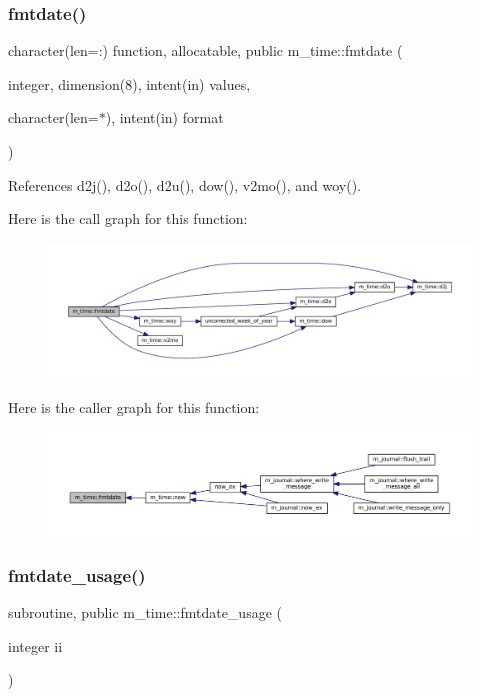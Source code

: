 \subsubsection{\texorpdfstring{fmtdate()}{fmtdate()}}
{\footnotesize\ttfamily character(len=\+:) function, allocatable, public m\+\_\+time\+::fmtdate (\begin{DoxyParamCaption}\item[{integer, dimension(8), intent(in)}]{values,  }\item[{character(len=$\ast$), intent(in)}]{format }\end{DoxyParamCaption})}



References d2j(), d2o(), d2u(), dow(), v2mo(), and woy().

Here is the call graph for this function\+:\nopagebreak
\begin{figure}[H]
\begin{center}
\leavevmode
\includegraphics[width=350pt]{namespacem__time_a2cb84c9b8af4f395b76aed76e1431328_cgraph}
\end{center}
\end{figure}
Here is the caller graph for this function\+:\nopagebreak
\begin{figure}[H]
\begin{center}
\leavevmode
\includegraphics[width=350pt]{namespacem__time_a2cb84c9b8af4f395b76aed76e1431328_icgraph}
\end{center}
\end{figure}
\mbox{\label{namespacem__time_a0ec30ca32f18ec409bbbef046a9e73f0}} 
\subsubsection{\texorpdfstring{fmtdate\+\_\+usage()}{fmtdate\_usage()}}
{\footnotesize\ttfamily subroutine, public m\+\_\+time\+::fmtdate\+\_\+usage (\begin{DoxyParamCaption}\item[{integer}]{ii }\end{DoxyParamCaption})}

